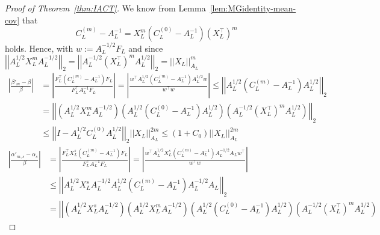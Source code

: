 \documentclass[11pt,english]{article}
\theoremstyle{plain}
\theoremstyle{plain}
\theoremstyle{plain}
\theoremstyle{plain}
\numberwithin{equation}{section}
\newcommand*{\id}{I}
\begin{document}
\begin{proof}[Proof of Theorem~\ref{thm:IACT}]
	We know from Lemma~\ref{lem:MGidentity-mean-cov} that
	\begin{equation}
		C_{L}^{(m)}-A_{L}^{-1}=X_{L}^{m}(C_{L}^{(0)}-A_{L}^{-1})(X_{L}^\top)^{m}
		\label{eqn:C_Lm}
	\end{equation}
	holds. Hence, with $\ensuremath{w:=A_{L}^{-1/2}F_{L}}$ and since $\left|\left|A_L^{1/2}X_L^m A_L^{-1/2}\right|\right|_2=\left|\left|A_L^{-1/2}(X_L^\top)^m A_L^{1/2}\right|\right|_2=||X_L||^m_{A_L}$
	\begin{equation}
		\begin{aligned}\left|\frac{\beta'_{m}-\beta}{\beta}\right| & =\left|\frac{F_{L}^{\top}(C_{L}^{(m)}-A_{L}^{-1})F_{L}}{F_{L}^{\top}A_{L}^{-1}F_{L}}\right|                                             =\left|\frac{w^{\top}A_{L}^{1/2}(C_{L}^{(m)}-A_{L}^{-1})A_{L}^{1/2}w}{w^{\top}w}\right|  \le\left|\left|A_{L}^{1/2}(C_{L}^{(m)}-A_{L}^{-1})A_{L}^{1/2}\right|\right|_{2}                                                                                                                                         \\ &= \left|\left|
               \left(A_L^{1/2} X_L^m A_L^{-1/2}\right) \left(A_L^{1/2} (C_L^{(0)}-A_L^{-1})A_L^{1/2}\right) \left(A_L^{-1/2}(X_L^\top)^m A_L^{1/2}\right)
               \right|\right|_2
               \\                                             &  \le \left|\left|\id - A_L^{1/2}C_{L}^{(0)}A_L^{1/2}\right|\right|_2 ||X_{L}||_{A_{L}}^{2m}\le (1+C_0) ||X_{L}||_{A_{L}}^{2m}
		\end{aligned}
		\label{eqn:beta_bound}
	\end{equation}
	\begin{equation}
		\begin{aligned}\left|\frac{\alpha'_{m,s}-\alpha_{s}}{\beta}\right| & =\left|\frac{F_{L}^{\top} X_{L}^{s}(C_{L}^{(m)}-A_{L}^{-1})F_{L}}{F_{L}^{\top}A_{L}^{-1}F_{L}}\right|   =\left|\frac{w^{\top}A_{L}^{1/2}X_{L}^{s}(C_{L}^{(m)}-A_{L}^{-1})A_{L}^{-1/2}A_{L}w^{\top}}{w^{\top}w}\right|                                   \\
                                                                   & \le\left|\left|A_{L}^{1/2}X_{L}^{s}A_{L}^{-1/2}A_{L}^{1/2}(C_{L}^{(m)}-A_{L}^{-1})A_{L}^{-1/2}A_{L}\right|\right|_{2}                                                                                                                  \\
                                                                   & =        \left|\left|
               \left(A_L^{1/2} X_L^s A_L^{-1/2}\right)\left(A_L^{1/2} X_L^m A_L^{-1/2}\right) \left(A_L^{1/2} (C_L^{(0)}-A_L^{-1})A_L^{1/2}\right) \left(A_L^{-1/2}(X_L^\top)^m A_L^{1/2}\right)

\end{aligned}
\end{equation}
\end{proof}
\end{document}
